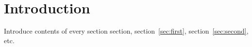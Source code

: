\section{Introduction}
Introduce contents of every section section, section~\ref{sec:first}, section~\ref{sec:second}, etc.
